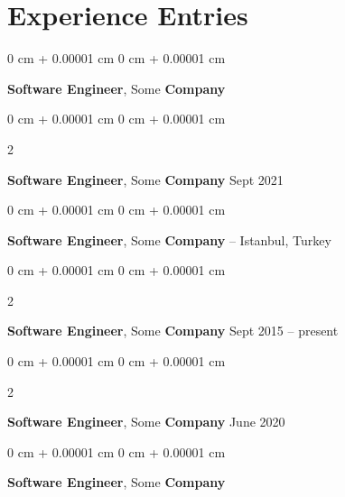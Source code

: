 \documentclass[10pt, letterpaper]{article}
\newenvironment{onecolentry}{
    \begin{adjustwidth}{
        0 cm + 0.00001 cm
    }{
        0 cm + 0.00001 cm
    }
}{
    \end{adjustwidth}
} %
\newenvironment{twocolentry}[2][]{
    \onecolentry
    \def\secondColumn{#2}
    \setcolumnwidth{\fill, 4.5 cm}
    \begin{paracol}{2}
}{
    \switchcolumn \raggedleft \secondColumn
    \end{paracol}
    \endonecolentry
} %
\begin{document}
    
    \section{Experience Entries}



        
        \begin{onecolentry}
            \textbf{Software Engineer}, Some \textbf{Company}\end{onecolentry}



        \vspace{0.2 cm}

        \begin{twocolentry}{
            Sept 2021
        }
            \textbf{Software Engineer}, Some \textbf{Company}\end{twocolentry}



        \vspace{0.2 cm}

        \begin{onecolentry}
            \textbf{Software Engineer}, Some \textbf{Company} -- Istanbul, Turkey\end{onecolentry}



        \vspace{0.2 cm}

        \begin{twocolentry}{
            Sept 2015 – present
        }
            \textbf{Software Engineer}, Some \textbf{Company}\end{twocolentry}



        \vspace{0.2 cm}

        \begin{twocolentry}{
            June 2020
        }
            \textbf{Software Engineer}, Some \textbf{Company}\end{twocolentry}



        \vspace{0.2 cm}

        \begin{onecolentry}
            \textbf{Software Engineer}, Some \textbf{Company}\end{onecolentry}
\end{document}
